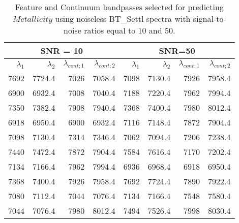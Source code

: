 \begin{table}
\begin{center}
\begin{tabular}{rrrr | rrrr}
  \hline
 \multicolumn{4}{c}{SNR = 10} &  \multicolumn{4}{c}{SNR=50} \\
  \hline
$\lambda_1$ & $\lambda_2$ & $\lambda_{cont;1}$ & $\lambda_{cont;2} $ & $\lambda_1$ & $\lambda_2$ & $\lambda_{cont;1}$ & $\lambda_{cont;2} $ \\ 
  \hline
7692 & 7724.4 &	7026 & 7058.4  &  7098 & 7130.4 & 7926 & 7958.4 \\
6900 & 6932.4 &	7008 & 7040.4  &  7188 & 7220.4 & 7962 & 7994.4  \\
7350 & 7382.4 &	7908 & 7940.4  &  7368 & 7400.4 & 7980 & 8012.4  \\
6918 & 6950.4 &	6900 & 6932.4  &  7116 & 7148.4 & 7872 & 7904.4  \\
7098 & 7130.4 &	7314 & 7346.4  &  7062 & 7094.4 & 7206 & 7238.4  \\
7440 & 7472.4 &	7872 & 7904.4  &  7584 & 7616.4 & 7170 & 7202.4  \\
7134 & 7166.4 &	7962 & 7994.4  &  6936 & 6968.4 & 6918 & 6950.4  \\
7368 & 7400.4 &	7926 & 7958.4  &  7692 & 7724.4 & 7890 & 7922.4  \\
7080 & 7112.4 &	7044 & 7076.4  &  7134 & 7166.4 & 7548 & 7580.4  \\
7044 & 7076.4 &	7980 & 8012.4  &  7494 & 7526.4 & 7998 & 8030.4  \\
\hline
\end{tabular}
\caption {Feature and Continuum bandpasses selected for predicting $Metallicity$ 
      using noiseless BT\_Settl spectra with signal-to-noise ratios
      equal to $10$ and 50.} \label{tab:tab_SNR1050_G}
\end{center}
\end{table}

